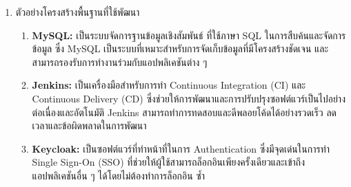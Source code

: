 \begin{enumerate}
\begin{enumerate}
\begin{enumerate}
            \textbf{ยกตัวอย่าง}
            \begin{center}                
                \begin{lstlisting}
getPosts {
    posts {
        owner {
            username
        }
    }
    owner {
        posts {
            content
        }
    }
}
                \end{lstlisting}
            \end{center}
            ในตัวอย่างนี้ ผู้ใช้งานขอค้นหาข้อมูล \texttt{posts} และ \texttt{owner} จากข้อมูลประเภท \texttt{GetPostsResult}
            \begin{enumerate}
                \item ฟิลด์ \texttt{posts} จะดึงข้อมูลเกี่ยวกับผู้โพสต์ (owner) และในส่วนของ \texttt{owner} จะทำการค้นหาชื่อผู้ใช้ (username)
                \item ฟิลด์ \texttt{owner} จะเรียกดูโพสต์ (post) ทั้งหมดที่ผู้ใช้นั้นสร้างขึ้น และภายในแต่ละโพสต์จะค้นหาเนื้อหาที่เกี่ยวข้อง
            \end{enumerate}
           
           \item การรวม API ด้วย Apollo Federation คือการสร้าง service ที่สามารถ reroute requests ไปยัง service อื่น ๆ ซึ่งหมายความว่าผู้ใช้สามารถส่ง API request ไปยัง service ใด ๆ ก็ได้ผ่าน router \cite{apollo-federation}

           \item Apollo Federation ยังมีฟีเจอร์ Reference Resolver ซึ่งช่วยในการค้นหาข้อมูลของ Objects ที่อยู่ใน service ที่แตกต่างกัน ตัวอย่างเช่น ``post" service มีการเก็บข้อมูลของทุก ๆ โพสต์และคอมเมนต์ แต่ข้อมูลของผู้ใช้แต่ละคนจะถูกจัดการโดย ``user" service แทน\enskip Apollo Federation จะช่วยให้ใน API \texttt{getPost} ที่ถูกจัดการโดย ``post" service สามารถไปส่ง \texttt{userId} ให้ router ไปจัดการการดึงข้อมูล user จาก ``user" service ต่อโดยอัตโนมัติ \cite{apollo-resolver-reference}

        \end{enumerate}
    \end{enumerate}
    \item ตัวอย่างโครงสร้างพื้นฐานที่ใช้พัฒนา
    \begin{enumerate}
        \item \textbf{MySQL:} เป็นระบบจัดการฐานข้อมูลเชิงสัมพันธ์ ที่ใช้ภาษา SQL ในการสืบค้นและจัดการข้อมูล ซึ่ง MySQL เป็นระบบที่เหมาะสำหรับการจัดเก็บข้อมูลที่มีโครงสร้างชัดเจน และสามารถรองรับการทำงานร่วมกับแอปพลิเคชันต่าง ๆ
        \item \textbf{Jenkins:} เป็นเครื่องมือสำหรับการทำ Continuous Integration (CI) และ Continuous Delivery (CD) ซึ่งช่วยให้การพัฒนาและการปรับปรุงซอฟต์แวร์เป็นไปอย่างต่อเนื่องและอัตโนมัติ Jenkins สามารถทำการทดสอบและดีพลอยโค้ดได้อย่างรวดเร็ว ลดเวลาและข้อผิดพลาดในการพัฒนา
        \item \textbf{Keycloak: } เป็นซอฟต์แวร์ที่ทําหน้าที่ในการ Authentication ซึ่งมีจุดเด่นในการทํา Single Sign-On
        (SSO) ที่ช่วยให้ผู้ใช้สามารถล็อกอินเพียงครั้งเดียวและเข้าถึงแอปพลิเคชันอื่น ๆ ได้โดยไม่ต้องทําการล็อกอิน
        ซํ้า 
    \end{enumerate}
\end{enumerate}